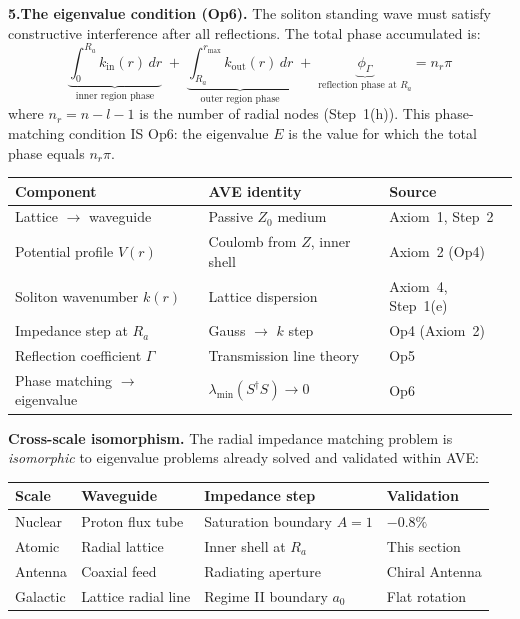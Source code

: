 \noindent\textbf{5.\;The eigenvalue condition (Op6).}
The soliton standing wave must satisfy constructive
interference after all reflections.
The total phase accumulated is:
\begin{equation}
    \underbrace{\int_0^{R_a} k_{\text{in}}(r)\,dr}_
    {\text{inner region phase}}
    \;+\;
    \underbrace{\int_{R_a}^{r_{\max}} k_{\text{out}}(r)\,dr}_
    {\text{outer region phase}}
    \;+\;
    \underbrace{\phi_\Gamma}_
    {\text{reflection phase at } R_a}
    = n_r \pi
    \label{eq:radial_eigenvalue}
\end{equation}
where $n_r = n - l - 1$ is the number of radial
nodes (Step~1(h)).  This phase-matching condition IS
Op6: the eigenvalue $E$ is the value for which the
total phase equals $n_r \pi$.

\begin{center}
\small
\renewcommand{\arraystretch}{1.25}
\begin{tabular}{lll}
\hline
\textbf{Component} & \textbf{AVE identity}
& \textbf{Source} \\
\hline
Lattice $\to$ waveguide & Passive $Z_0$ medium
& Axiom~1, Step~2 \\
Potential profile $V(r)$ & Coulomb from $Z$,
inner shell & Axiom~2 (Op4) \\
Soliton wavenumber $k(r)$ & Lattice dispersion
& Axiom~4, Step~1(e) \\
Impedance step at $R_a$ & Gauss $\to$ $k$ step
& Op4 (Axiom~2) \\
Reflection coefficient $\Gamma$ & Transmission line
theory & Op5 \\
Phase matching $\to$ eigenvalue & $\lambda_{\min}
(S^\dagger S) \to 0$ & Op6 \\
\hline
\end{tabular}
\end{center}

\noindent\textbf{Cross-scale isomorphism.}
The radial impedance matching problem is
\emph{isomorphic} to eigenvalue problems already
solved and validated within AVE:
\begin{center}
\small
\renewcommand{\arraystretch}{1.25}
\begin{tabular}{llll}
\hline
\textbf{Scale} & \textbf{Waveguide}
& \textbf{Impedance step}
& \textbf{Validation} \\
\hline
Nuclear & Proton flux tube
& Saturation boundary $A = 1$ & $-0.8\%$ \\
Atomic & Radial lattice
& Inner shell at $R_a$ & This section \\
Antenna & Coaxial feed
& Radiating aperture & Chiral Antenna \\
Galactic & Lattice radial line
& Regime II boundary $a_0$ & Flat rotation \\
\hline
\end{tabular}
\end{center}

